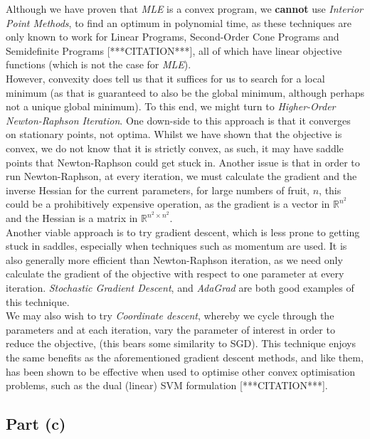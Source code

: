 Although we have proven that \textit{MLE} is a convex program, we \textbf{cannot} use \textit{Interior Point Methods}, to find an optimum in polynomial time, as these techniques are only known to work for Linear Programs, Second-Order Cone Programs and Semidefinite Programs [***CITATION***], all of which have linear objective functions (which is not the case for \textit{MLE}).\\[1em]

However, convexity does tell us that it suffices for us to search for a local minimum (as that is guaranteed to also be the global minimum, although perhaps not a unique global minimum). To this end, we might turn to \textit{Higher-Order Newton-Raphson Iteration}. One down-side to this approach is that it converges on stationary points, not optima. Whilst we have shown that the objective is convex, we do not know that it is strictly convex, as such, it may have saddle points that Newton-Raphson could get stuck in. Another issue is that in order to run Newton-Raphson, at every iteration, we must calculate the gradient and the inverse Hessian for the current parameters, for large numbers of fruit, $n$, this could be a prohibitively expensive operation, as the gradient is a vector in $\mathbb{R}^{n^2}$ and the Hessian is a matrix in $\mathbb{R}^{n^2\times n^2}$.\\[1em]

Another viable approach is to try gradient descent, which is less prone to getting stuck in saddles, especially when techniques such as momentum are used. It is also generally more efficient than Newton-Raphson iteration, as we need only calculate the gradient of the objective with respect to one parameter at every iteration. \textit{Stochastic Gradient Descent}, and \textit{AdaGrad} are both good examples of this technique.\\[1em]

We may also wish to try \textit{Coordinate descent}, whereby we cycle through the parameters and at each iteration, vary the parameter of interest in order to reduce the objective, (this bears some similarity to SGD). This technique enjoys the same benefits as the aforementioned gradient descent methods, and like them, has been shown to be effective when used to optimise other convex optimisation problems, such as the dual (linear) SVM formulation [***CITATION***].

\subsection{Part (c)}

